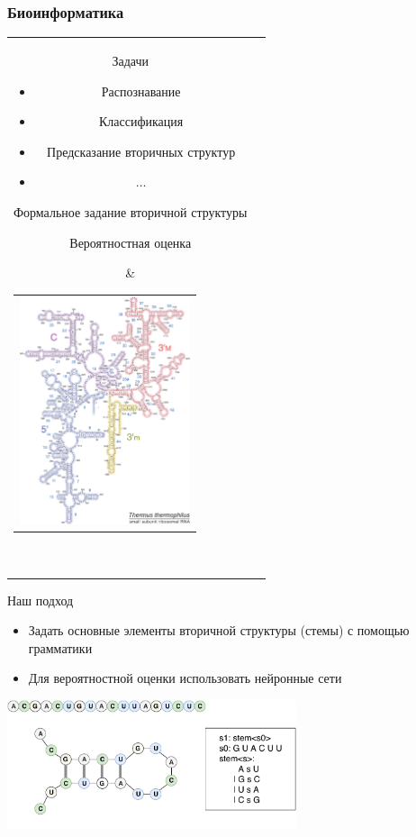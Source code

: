 \documentclass{beamer}
\begin{document}
\begin{frame} \frametitle{Биоинформатика}
\begin{tabular}{cl}  
    \parbox{0.44\linewidth}{
        \begin{itemize}
            \item Задачи
            \begin{itemize}
                \item Распознавание
                \item Классификация
                \item Предсказание вторичных структур
                \item ...
            \end{itemize}
   {\item Формальное задание вторичной структуры}
    {\item Вероятностная оценка}
        \end{itemize}
    }
    & \begin{tabular}{l}
        \vspace{-0.8cm}
        \hspace{-0.8cm}
        \includegraphics[width=5.0cm]{pics/16s.pdf}
    \end{tabular}  \\
\end{tabular}
\end{frame}

\begin{frame}{Наш подход}
\begin{itemize}
    \item Задать основные элементы вторичной структуры (стемы) с помощью грамматики 
    \item Для вероятностной оценки использовать нейронные сети
\end{itemize}

\vspace{1.0cm}
\begin{center}
    \includegraphics[width=8.5cm]{pics/molekula.pdf} 
\end{center}
    
\end{frame}
\end{document}
